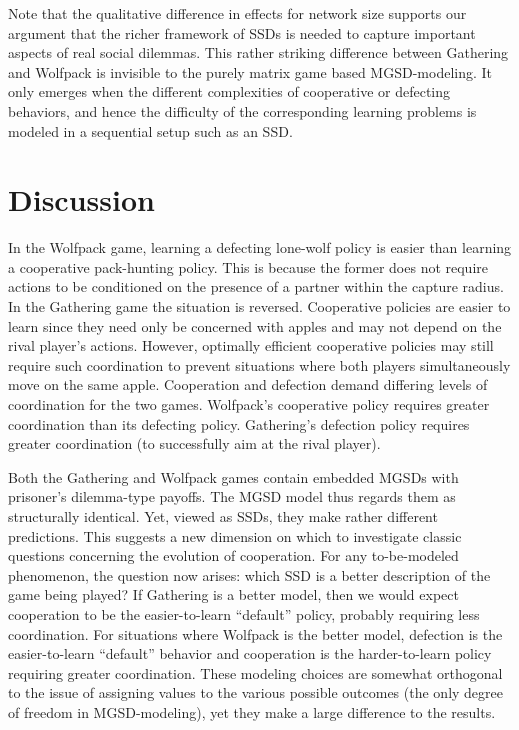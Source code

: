 \documentclass{aamas2017}
\begin{document}
Note that the qualitative difference in effects for network size supports our argument that the richer framework of SSDs is needed to capture important aspects of real social dilemmas. This rather striking difference between Gathering and Wolfpack is invisible to the purely matrix game based MGSD-modeling. It only emerges when the different complexities of cooperative or defecting behaviors, and hence the difficulty of the corresponding learning problems is modeled in a sequential setup such as an SSD.


\section{Discussion}\label{sec:discussion}
In the Wolfpack game, learning a defecting lone-wolf policy is easier than learning a cooperative pack-hunting policy. This is because the former does not require actions to be conditioned on the presence of a partner within the capture radius. In the Gathering game the situation is reversed. Cooperative policies are easier to learn since they need only be concerned with apples and may not depend on the rival player's actions. However, optimally efficient cooperative policies may still require such coordination to prevent situations where both players simultaneously move on the same apple. Cooperation and defection demand differing levels of coordination for the two games. Wolfpack's cooperative policy requires greater coordination than its defecting policy. Gathering's defection policy requires greater coordination (to successfully aim at the rival player).

Both the Gathering and Wolfpack games contain embedded MGSDs with prisoner's dilemma-type payoffs. The MGSD  model thus regards them as structurally identical. Yet, viewed as SSDs, they make rather different predictions. This suggests a new dimension on which to investigate classic questions concerning the evolution of cooperation. For any to-be-modeled phenomenon, the question now arises: which SSD is a better description of the game being played? If Gathering is a better model, then we would expect cooperation to be the easier-to-learn ``default'' policy, probably requiring less coordination. For situations where Wolfpack is the better model, defection is the easier-to-learn ``default'' behavior and cooperation is the harder-to-learn policy requiring greater coordination. These modeling choices are somewhat orthogonal to the issue of assigning values to the various possible outcomes (the only degree of freedom in MGSD-modeling), yet they make a large difference to the results.
\end{document}
